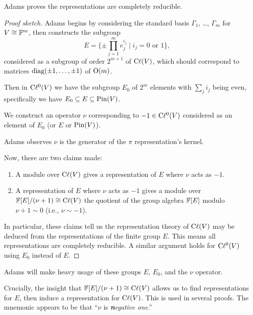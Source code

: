 Adams proves the representations are completely reducible.

\begin{proof}[Proof sketch]
Adams begins by considering the standard basis $\Gamma_{1}$, \dots, $\Gamma_{m}$
for $V\cong\mathbb{F}^{m}$, then constructs the subgroup
\begin{equation}
E = \{\pm\prod^{m}_{j=1}e^{i_{j}}_{j} \mid i_{j}=0\mbox{ or }1\},
\end{equation}
considered as a subgroup of order $2^{m+1}$ of $\mathrm{C}\ell(V)$, which should
correspond to matrices $\operatorname{diag}(\pm1,\dots,\pm1)$ of $\mathrm{O}(m)$.

Then in $\mathrm{C}\ell^{0}(V)$ we have the subgroup $E_{0}$ of $2^{m}$ elements
with $\sum_{j}i_{j}$ being even, specifically we have $E_{0}\subseteq E\subseteq\operatorname{Pin}(V)$.

We construct an operator $\nu$ corresponding to $-1\in\mathrm{C}\ell^{0}(V)$
considered as an element of $E_{0}$ (or $E$ or $\operatorname{Pin}(V)$).

Adams observes $\nu$ is the generator of the $\pi$ representation's kernel.

Now, there are two claims made:
\begin{enumerate}
\item A module over $\mathrm{C}\ell(V)$ gives a representation of $E$ where $\nu$
  acts as $-1$.
\item A representation of $E$ where $\nu$ acts as $-1$ gives a module
  over $\mathbb{F}[E]/(\nu+1)\cong\mathrm{C}\ell(V)$ the quotient of the group algebra
  $\mathbb{F}[E]$ modulo $\nu+1\sim0$ (i.e., $\nu\sim-1$).
\end{enumerate}
In particular, these claims tell us the representation theory of
$\mathrm{C}\ell(V)$ may be deduced from the representations of the finite group $E$.
This means all representations are completely reducible. A similar
argument holds for $\mathrm{C}\ell^{0}(V)$ using $E_{0}$ instead of $E$.
\end{proof}

\begin{remark}
Adams will make heavy usage of these groups $E$, $E_{0}$, and the $\nu$ operator.
\end{remark}

\begin{remark}
Crucially, the insight that $\mathbb{F}[E]/(\nu+1)\cong\mathrm{C}\ell(V)$ allows us to find
representations for $E$, then induce a representation for $\mathrm{C}\ell(V)$. This
is used in several proofs. The mnemonic appears to be that ``$\nu$ is
\emph{\textbf{n}egative one}.''
\end{remark}

